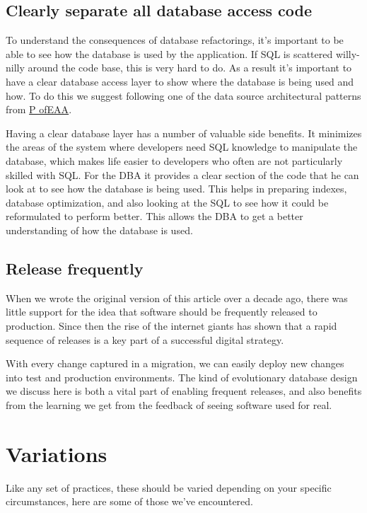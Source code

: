 \documentclass[12pt]{article}
\begin{document}
\subsection{Clearly separate all database access code}

To understand the consequences of database refactorings, it's important
to be able to see how the database is used by the application. If SQL is
scattered willy-nilly around the code base, this is very hard to do. As
a result it's important to have a clear database access layer to show
where the database is being used and how. To do this we suggest
following one of the data source architectural patterns from
\href{https://martinfowler.com/books/eaa.html}{P ofEAA}.

Having a clear database layer has a number of valuable side benefits. It
minimizes the areas of the system where developers need SQL knowledge to
manipulate the database, which makes life easier to developers who often
are not particularly skilled with SQL. For the DBA it provides a clear
section of the code that he can look at to see how the database is being
used. This helps in preparing indexes, database optimization, and also
looking at the SQL to see how it could be reformulated to perform
better. This allows the DBA to get a better understanding of how the
database is used.

\subsection{Release frequently}

When we wrote the original version of this article over a decade ago,
there was little support for the idea that software should be frequently
released to production. Since then the rise of the internet giants has
shown that a rapid sequence of releases is a key part of a successful
digital strategy.

With every change captured in a migration, we can easily deploy new
changes into test and production environments. The kind of evolutionary
database design we discuss here is both a vital part of enabling
frequent releases, and also benefits from the learning we get from the
feedback of seeing software used for real.

\section{Variations}

Like any set of practices, these should be varied depending on your
specific circumstances, here are some of those we've encountered.
\end{document}
